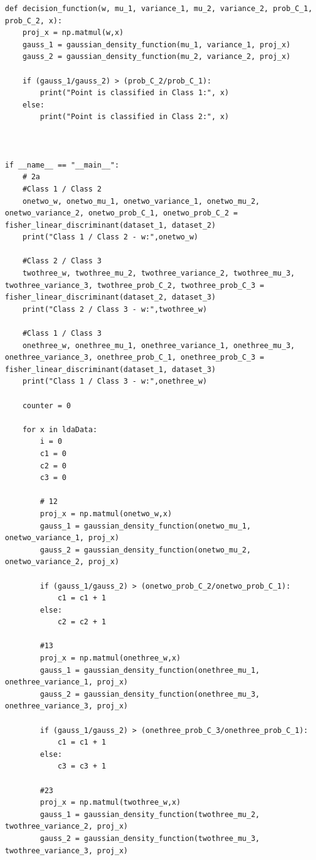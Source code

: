 \begin{lstlisting}
def decision_function(w, mu_1, variance_1, mu_2, variance_2, prob_C_1, prob_C_2, x):
    proj_x = np.matmul(w,x)
    gauss_1 = gaussian_density_function(mu_1, variance_1, proj_x)
    gauss_2 = gaussian_density_function(mu_2, variance_2, proj_x)
    
    if (gauss_1/gauss_2) > (prob_C_2/prob_C_1):
        print("Point is classified in Class 1:", x)
    else:
        print("Point is classified in Class 2:", x)
    


if __name__ == "__main__":
    # 2a
    #Class 1 / Class 2
    onetwo_w, onetwo_mu_1, onetwo_variance_1, onetwo_mu_2, onetwo_variance_2, onetwo_prob_C_1, onetwo_prob_C_2 = fisher_linear_discriminant(dataset_1, dataset_2)
    print("Class 1 / Class 2 - w:",onetwo_w)
    
    #Class 2 / Class 3
    twothree_w, twothree_mu_2, twothree_variance_2, twothree_mu_3, twothree_variance_3, twothree_prob_C_2, twothree_prob_C_3 = fisher_linear_discriminant(dataset_2, dataset_3)
    print("Class 2 / Class 3 - w:",twothree_w)
    
    #Class 1 / Class 3
    onethree_w, onethree_mu_1, onethree_variance_1, onethree_mu_3, onethree_variance_3, onethree_prob_C_1, onethree_prob_C_3 = fisher_linear_discriminant(dataset_1, dataset_3)
    print("Class 1 / Class 3 - w:",onethree_w)
    
    counter = 0
    
    for x in ldaData:
        i = 0
        c1 = 0
        c2 = 0 
        c3 = 0
        
        # 12
        proj_x = np.matmul(onetwo_w,x)
        gauss_1 = gaussian_density_function(onetwo_mu_1, onetwo_variance_1, proj_x)
        gauss_2 = gaussian_density_function(onetwo_mu_2, onetwo_variance_2, proj_x)
        
        if (gauss_1/gauss_2) > (onetwo_prob_C_2/onetwo_prob_C_1):
            c1 = c1 + 1
        else:
            c2 = c2 + 1
            
        #13
        proj_x = np.matmul(onethree_w,x)
        gauss_1 = gaussian_density_function(onethree_mu_1, onethree_variance_1, proj_x)
        gauss_2 = gaussian_density_function(onethree_mu_3, onethree_variance_3, proj_x)
        
        if (gauss_1/gauss_2) > (onethree_prob_C_3/onethree_prob_C_1):
            c1 = c1 + 1
        else:
            c3 = c3 + 1
            
        #23
        proj_x = np.matmul(twothree_w,x)
        gauss_1 = gaussian_density_function(twothree_mu_2, twothree_variance_2, proj_x)
        gauss_2 = gaussian_density_function(twothree_mu_3, twothree_variance_3, proj_x)
        

\end{lstlisting}
